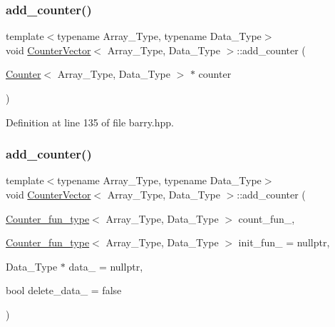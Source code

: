 \mbox{\label{classbarry_1_1_counter_vector_a062d52e18f1d3ba4c00cbf4c2d89f1e7}} 
\subsubsection{\texorpdfstring{add\+\_\+counter()}{add\_counter()}\hspace{0.1cm}{\footnotesize\ttfamily [2/3]}}
{\footnotesize\ttfamily template$<$typename Array\+\_\+\+Type, typename Data\+\_\+\+Type$>$ \\
void \hyperlink{classbarry_1_1_counter_vector}{Counter\+Vector}$<$ Array\+\_\+\+Type, Data\+\_\+\+Type $>$\+::add\+\_\+counter (\begin{DoxyParamCaption}\item[{\hyperlink{classbarry_1_1_counter}{Counter}$<$ Array\+\_\+\+Type, Data\+\_\+\+Type $>$ $\ast$}]{counter }\end{DoxyParamCaption})\hspace{0.3cm}{\ttfamily [inline]}}



Definition at line 135 of file barry.\+hpp.

\mbox{\label{classbarry_1_1_counter_vector_adb32ff1af45bc05a292a5cb064dc414d}} 
\subsubsection{\texorpdfstring{add\+\_\+counter()}{add\_counter()}\hspace{0.1cm}{\footnotesize\ttfamily [3/3]}}
{\footnotesize\ttfamily template$<$typename Array\+\_\+\+Type, typename Data\+\_\+\+Type$>$ \\
void \hyperlink{classbarry_1_1_counter_vector}{Counter\+Vector}$<$ Array\+\_\+\+Type, Data\+\_\+\+Type $>$\+::add\+\_\+counter (\begin{DoxyParamCaption}\item[{\hyperlink{namespacebarry_abaaae3200da8e4b7faac3c04fe9c3081}{Counter\+\_\+fun\+\_\+type}$<$ Array\+\_\+\+Type, Data\+\_\+\+Type $>$}]{count\+\_\+fun\+\_\+,  }\item[{\hyperlink{namespacebarry_abaaae3200da8e4b7faac3c04fe9c3081}{Counter\+\_\+fun\+\_\+type}$<$ Array\+\_\+\+Type, Data\+\_\+\+Type $>$}]{init\+\_\+fun\+\_\+ = {\ttfamily nullptr},  }\item[{Data\+\_\+\+Type $\ast$}]{data\+\_\+ = {\ttfamily nullptr},  }\item[{bool}]{delete\+\_\+data\+\_\+ = {\ttfamily false} }\end{DoxyParamCaption})\hspace{0.3cm}{\ttfamily [inline]}}



